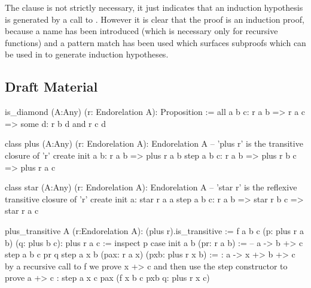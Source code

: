 The  clause is not strictly necessary, it just indicates that an
induction hypothesis is generated by a call to . However it is clear
that the proof is an induction proof, because a name  has been
introduced (which is necessary only for recursive functions) and a pattern
match has been used which surfaces subproofs which can be used in  to
generate induction hypotheses.





\subsection{Draft Material}


\begin{alba}
  is_diamond (A:Any) (r: Endorelation A): Proposition :=
    all a b c: r a b => r a c => some d: r b d and r c d

  class
    plus (A:Any) (r: Endorelation A): Endorelation A
      -- 'plus r' is the transitive closure of 'r'
  create
    init a b: r a b => plus r a b
    step a b c: r a b => plus r b c => plus r a c

  class
    star (A:Any) (r: Endorelation A): Endorelation A
      -- 'star r' is the reflexive transitive closure of 'r'
  create
    init a: star r a a
    step a b c: r a b => star r b c => star r a c
\end{alba}







\begin{alba}
  plus_transitive A (r:Endorelation A): (plus r).is_transitive :=
    f a b c (p: plus r a b) (q: plus b c): plus r a c :=
      inspect
        p
      case
        init a b (pr: r a b) :=
            -- a -> b +> c
          step a b c pr q
        step a x b (pax: r a x) (pxb: plus r x b) :=
            {: a -> x +> b +> c
               by a recursive call to f we prove x +> c
               and then use the step constructor to prove a +> c :}
          step a x c pax (f x b c pxb q: plus r x c)
\end{alba}



